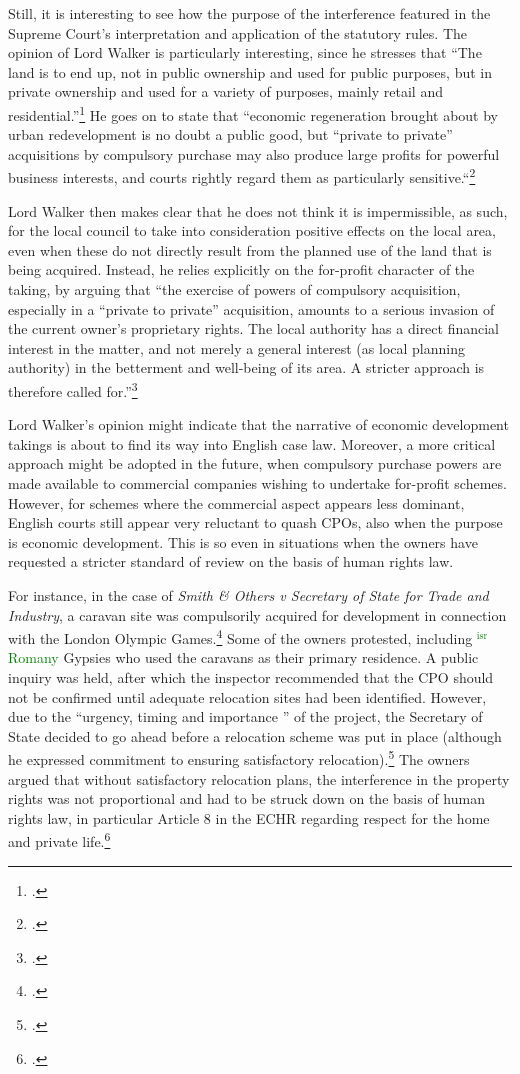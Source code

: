 \documentclass[12pt,a4paper]{book} %
\newcommand{\isr}[1]{\textcolor{green}{$^{\textrm{isr}}${#1}}}
\begin{document}
Still, it is interesting to see how the purpose of the interference featured in the Supreme Court's interpretation and application of the statutory rules. The opinion of Lord Walker is particularly interesting, since he stresses that ``The land is to end up, not in public ownership and used for public purposes, but in private ownership and used for a variety of purposes, mainly retail and residential.''\footcite[81]{sainsbury10} He goes on to state that ``economic regeneration brought about by urban redevelopment is no doubt a public good, but ``private to private'' acquisitions by compulsory purchase may also produce large profits for powerful business interests, and courts rightly regard them as particularly sensitive.``\footcite[81]{sainsbury10}

Lord Walker then makes clear that he does not think it is impermissible, as such, for the local council to take into consideration positive effects on the local area, even when these do not directly result from the planned use of the land that is being acquired. Instead, he relies explicitly on the for-profit character of the taking, by arguing that ``the exercise of powers of compulsory acquisition, especially in a ``private to private'' acquisition, amounts to a serious invasion of the current owner's proprietary rights. The local authority has a direct financial interest in the matter, and not merely a general interest (as local planning authority) in the betterment and well-being of its area. A stricter approach is therefore called for.''\footcite[84]{sainsbury10} 

Lord Walker's opinion might indicate that the narrative of economic development takings is about to find its way into English case law. Moreover, a more critical approach might be adopted in the future, when compulsory purchase powers are made available to commercial companies wishing to undertake for-profit schemes. However, for schemes where the commercial aspect appears less dominant, English courts still appear very reluctant to quash CPOs, also when the purpose is economic development. This is so even in situations when the owners have requested a stricter standard of review on the basis of human rights law. 

For instance, in the case of {\it Smith \& Others v Secretary of State for Trade and Industry}, a caravan site was compulsorily acquired for development in connection with the London Olympic Games.\footcite{smith08} Some of the owners protested, including \isr{Romany} Gypsies who used the caravans as their primary residence. A public inquiry was held, after which the inspector recommended that the CPO should not be confirmed until adequate relocation sites had been identified. However, due to the ``urgency, timing and importance '' of the project, the Secretary of State decided to go ahead before a relocation scheme was put in place (although he expressed commitment to ensuring satisfactory relocation).\footcite[10]{smith08} The owners argued that without satisfactory relocation plans, the interference in the property rights was not proportional and had to be struck down on the basis of human rights law, in particular Article 8 in the ECHR regarding respect for the home and private life.\footcite[27-51]{smith08}
\end{document}
